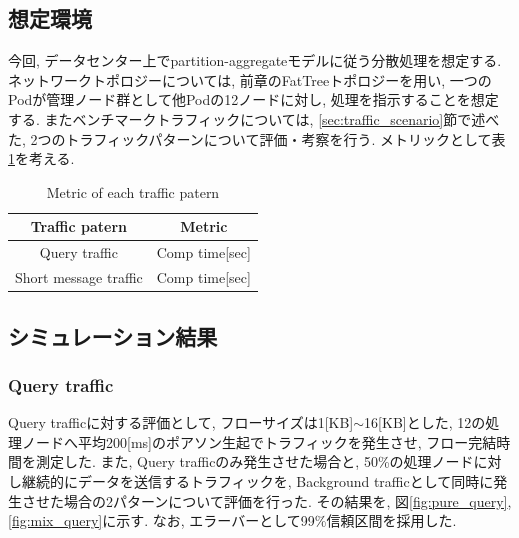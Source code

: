 \documentclass[10pt, a4paper, twocolumn]{jsarticle}
\begin{document}
\subsection{想定環境}
今回, データセンター上でpartition-aggregateモデルに従う分散処理を想定する.
ネットワークトポロジーについては, 前章のFatTreeトポロジーを用い, 一つのPodが管理ノード群として他Podの12ノードに対し,
処理を指示することを想定する.
またベンチマークトラフィックについては, \ref{sec:traffic_scenario}節で述べた, 2つのトラフィックパターンについて評価・考察を行う.
メトリックとして表\ref{metric}を考える.
\begin{table}[h]
\begin{center}
\footnotesize
\begin{tabular}{c|c}
\hline
Traffic patern & Metric \\ \hline \hline
Query traffic & Comp time[sec] \\
Short message traffic & Comp time[sec] \\
\hline
\end{tabular}
\caption{Metric of each traffic patern}
\label{metric}
\end{center}
\end{table}

\subsection{シミュレーション結果}

\subsubsection{Query traffic}
Query trafficに対する評価として, フローサイズは1[KB]$\sim$16[KB]とした,
12の処理ノードへ平均200[ms]のポアソン生起でトラフィックを発生させ, フロー完結時間を測定した.
また, Query trafficのみ発生させた場合と, 50\%の処理ノードに対し継続的にデータを送信するトラフィックを, Background
trafficとして同時に発生させた場合の2パターンについて評価を行った.
その結果を, 図\ref{fig:pure_query}, \ref{fig:mix_query}に示す.
なお, エラーバーとして99\%信頼区間を採用した.
\end{document}
